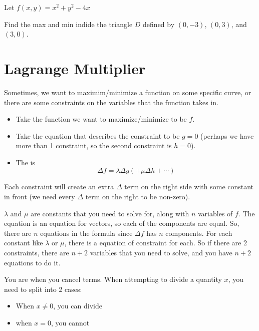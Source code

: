 \documentclass[11pt,fleqn]{book} %
\begin{document}
\begin{exercise}
    Let $f(x,y) = x^2 + y^2 - 4x$

    Find the max and min indide the triangle $D$ defined by $(0, -3)$, $(0, 3)$, and $(3, 0)$. 
\end{exercise}

\section{Lagrange Multiplier}

Sometimes, we want to maximim/minimize a function on some specific curve, or there are some constraints on the variables that the function takes in. 

\begin{itemize}
    \item Take the function we want to maximize/minimize to be $f$.

    \item Take the equation that describes the constraint to be $g = 0$ (perhaps we have more than 1 constraint, so the second constraint is $h = 0$).

    \item The  is $$\Delta f = \lambda \Delta g(+\mu \Delta h + \cdots)$$
\end{itemize}

Each constraint will create an extra $\Delta$ term on the right side with some constant in front (we need every $\Delta$ term on the right to be non-zero). 

$\lambda$ and $\mu$ are constants that you need to solve for, along with $n$ variables of $f$. The equation is an equation for vectors, so each of the components are equal. So, there are $n$ equations in the formula since $\Delta f$ has $n$ components. For each constant like $\lambda$ or $\mu$, there is a equation of constraint for each. So if there are 2 constraints, there are $n + 2$ variables that you need to solve, and you have $n + 2$ equations to do it.

You are  when you cancel terms. When attempting to divide a quantity $x$, you need to split into 2 cases:
\begin{itemize}
    \item When $x \neq 0$, you can divide
    \item when $x = 0$, you cannot
\end{itemize}
\end{document}

